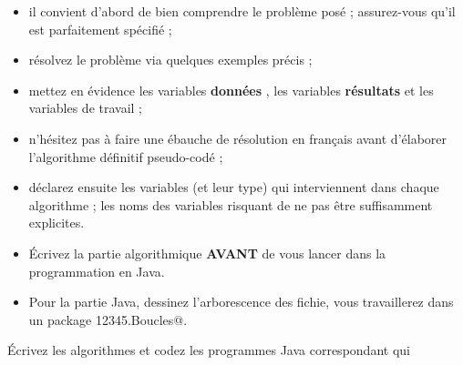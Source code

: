 \documentclass[11pt,a4paper]{article}
\begin{document}
					\begin{itemize}
				
			\item il convient d'abord de bien comprendre le probl\`eme pos\'e ; assurez-vous qu'il est parfaitement sp\'ecifi\'e ;
			\item r\'esolvez le probl\`eme via quelques exemples pr\'ecis ;
			\item mettez en \'evidence les variables \textbf{\guillemotleft  donn\'ees \guillemotright }, les variables \textbf{\guillemotleft  r\'esultats \guillemotright } et les variables de travail ;
			\item n'h\'esitez pas \`a faire une \'ebauche de r\'esolution en fran\c cais avant d'\'elaborer l'algorithme d\'efinitif pseudo-cod\'e ;
			\item d\'eclarez ensuite les variables (et leur type) qui interviennent dans chaque algorithme ; les noms des variables risquant de ne pas \^etre suffisamment explicites.
			\item \'Ecrivez la partie algorithmique \textbf{AVANT} de vous lancer dans la programmation en Java.
			\item Pour la partie Java, dessinez l'arborescence des fichie, vous travaillerez dans un package  \verb@g12345.Boucles@. 
					\end{itemize}
				
            \par
        
        \'Ecrivez les algorithmes et codez les programmes Java correspondant qui 
          
\end{document}
